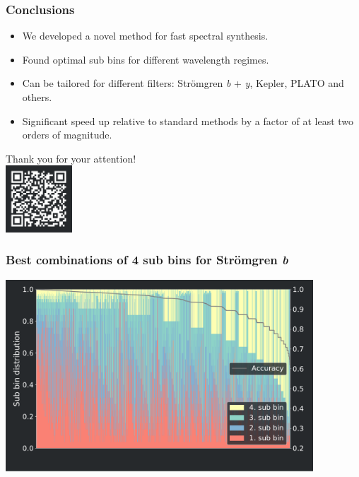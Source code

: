 \frame
{
	\frametitle{Conclusions}
	\large{
	\begin{itemize}
	\item We developed a novel method for fast spectral synthesis. \\[15pt]
	\item Found optimal sub bins for different wavelength regimes.\\[15pt]
    \item Can be tailored for different filters: Strömgren \textit{b} + \textit{y}, Kepler, PLATO  and others.\\[15pt]
    \item Significant speed up relative to standard  methods by a factor of at least two orders of magnitude.\\[10pt]
	\end{itemize}
	
	}
	\pause
		\centering \alert{\Large{Thank you for your attention!}} \\
		\pause
		\includegraphics[width=25mm]{images/qr}
}


\frame
{
	\frametitle{Best combinations of 4 sub bins for Str\"omgren \textit{b}}
	\centering
	\includegraphics[width=115mm]{images/optimal_stroemgren_0_c_b}
}

